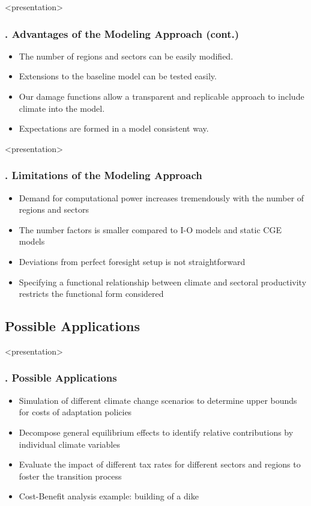 \documentclass[11pt,aspectratio=169]{beamer}
\begin{document}
\begin{frame}<presentation>
	\frametitle{{\thesection.\thesubsection} Advantages of the Modeling Approach (cont.)}
		\begin{itemize}
		\item The number of regions and sectors can be easily modified.
		\item Extensions to the baseline model can be tested easily. 
		\item Our damage functions allow a transparent and replicable approach to include climate into the model.
		\item Expectations are formed in a model consistent way.
		\end{itemize}
	\end{frame} 
	

	
	
\begin{frame}<presentation>
	\frametitle{{\thesection.\thesubsection} Limitations of the Modeling Approach}
		\begin{itemize}
			\item Demand for computational power increases tremendously with the number of regions and sectors 
			\item The number factors is smaller compared to I-O models and static CGE models
			\item Deviations from perfect foresight setup is not straightforward
			\item Specifying a functional relationship between climate and sectoral productivity restricts the functional form considered
		\end{itemize}
	\end{frame} 	
	
	


\subsection{Possible Applications}
\begin{frame}<presentation>
	\frametitle{{\thesection.\thesubsection} Possible Applications}
	\begin{itemize}
		\item Simulation of different climate change scenarios to determine upper bounds for costs of adaptation policies
		\item Decompose general equilibrium effects to identify relative contributions by individual climate variables
		\item Evaluate the impact of different tax rates for different sectors and regions to foster the transition process
		\item Cost-Benefit analysis example: building of a dike
	
	\end{itemize}
\end{frame}
\end{document}
